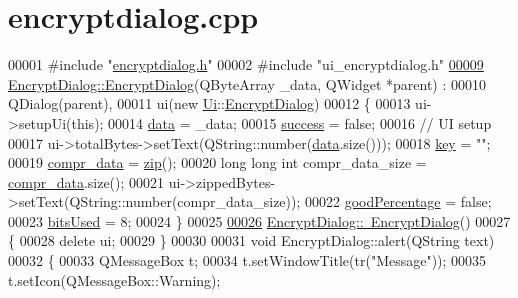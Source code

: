 \hypertarget{encryptdialog_8cpp_source}{}\section{encryptdialog.\+cpp}

\begin{DoxyCode}
00001 \textcolor{preprocessor}{#include "\hyperlink{encryptdialog_8h}{encryptdialog.h}"}
00002 \textcolor{preprocessor}{#include "ui\_encryptdialog.h"}
\hypertarget{encryptdialog_8cpp_source.tex_l00009}{}\hyperlink{class_encrypt_dialog_ab57e8b3a0d00c977e81f3b356657524e}{00009} \hyperlink{class_encrypt_dialog_ab57e8b3a0d00c977e81f3b356657524e}{EncryptDialog::EncryptDialog}(QByteArray \_data, QWidget *parent) :
00010     QDialog(parent),
00011     ui(new \hyperlink{namespace_ui}{Ui}::\hyperlink{class_encrypt_dialog}{EncryptDialog})
00012 \{
00013     ui->setupUi(\textcolor{keyword}{this});
00014     \hyperlink{class_encrypt_dialog_acf3a8bbce90d99ef17fec093c35b1008}{data} = \_data;
00015     \hyperlink{class_encrypt_dialog_ada4900bcd40894d9c098c65aa4066ac9}{success} = \textcolor{keyword}{false};
00016     \textcolor{comment}{// UI setup}
00017     ui->totalBytes->setText(QString::number(\hyperlink{class_encrypt_dialog_acf3a8bbce90d99ef17fec093c35b1008}{data}.size()));
00018     \hyperlink{class_encrypt_dialog_a1afdef3c665fb0d0fae06d1df8e84951}{key} = \textcolor{stringliteral}{""};
00019     \hyperlink{class_encrypt_dialog_a3e8998aa39696cbd1242f6420ef18143}{compr\_data} = \hyperlink{class_encrypt_dialog_a2bff820a3df4ddc36ecb07ed74b7138a}{zip}();
00020     \textcolor{keywordtype}{long} \textcolor{keywordtype}{long} \textcolor{keywordtype}{int} compr\_data\_size = \hyperlink{class_encrypt_dialog_a3e8998aa39696cbd1242f6420ef18143}{compr\_data}.size();
00021     ui->zippedBytes->setText(QString::number(compr\_data\_size));
00022     \hyperlink{class_encrypt_dialog_a0c821b893cfddd7a6c07bbd270ba49e9}{goodPercentage} = \textcolor{keyword}{false};
00023     \hyperlink{class_encrypt_dialog_abf638fea37fbdbaba215954e2e239860}{bitsUsed} = 8;
00024 \}
00025 
\hypertarget{encryptdialog_8cpp_source.tex_l00026}{}\hyperlink{class_encrypt_dialog_a466e283080f87ee50f172052e43e38b6}{00026} \hyperlink{class_encrypt_dialog_a466e283080f87ee50f172052e43e38b6}{EncryptDialog::~EncryptDialog}()
00027 \{
00028     \textcolor{keyword}{delete} ui;
00029 \}
00030 
00031 \textcolor{keywordtype}{void} EncryptDialog::alert(QString text)
00032 \{
00033     QMessageBox t;
00034     t.setWindowTitle(tr(\textcolor{stringliteral}{"Message"}));
00035     t.setIcon(QMessageBox::Warning);

\end{DoxyCode}
